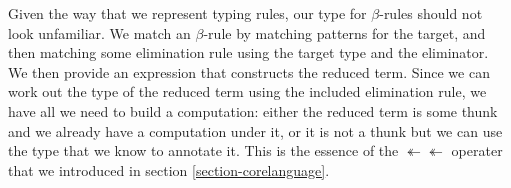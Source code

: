 
Given the way that we represent typing rules, our type for $β$-rules
should not look unfamiliar. We match an $β$-rule by matching patterns
for the target, and then matching some elimination rule using the
target type and the eliminator. We then provide an expression that
constructs the reduced term. Since we can work out the type of the
reduced term using the included elimination rule, we have all we need
to build a computation: either the reduced term is some thunk and
we already have a computation under it, or it is not a thunk but we
can use the type that we know to annotate it. This is the essence of
the $↞↞$ operater that we introduced in section \ref{section-corelanguage}.

